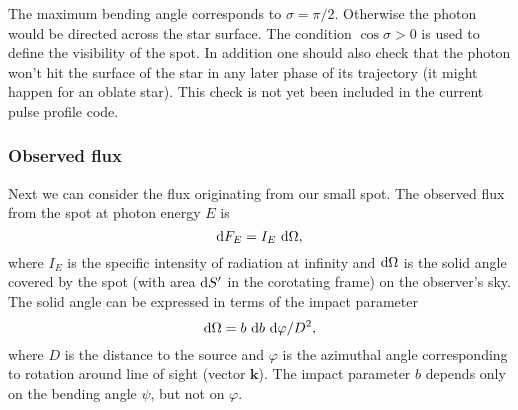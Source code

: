 \documentclass{wihuri}
\def\be{\begin{equation}}
\def\ee{\end{equation}}
\def\d{{\rm d}}
\def\Dop{\delta}
\def\ene{E}%
\newcommand{\bmath}[1]{\boldsymbol{#1}}
\begin{document}
The maximum bending angle corresponds to $\sigma=\pi/2$. Otherwise the photon would be directed across the star surface. 
The condition $\cos \sigma>0$ is used to define the visibility of the spot. In addition one should also check that the photon won't hit the surface of the star in any later phase of its trajectory (it might happen for an oblate star). This check is not yet been included in the current pulse profile code.


\subsubsection{Observed flux}

Next we can consider the flux originating from our small spot. The observed flux from the spot at photon energy $E$ is
\be
\label{eq:dF_E2}
  \d F_{\ene}=I_{\ene}\ \d\Omega,
\ee
where $I_{\ene}$ is the specific intensity of radiation at infinity and $\d\Omega$ is
the solid angle covered by the spot (with area $\d S'$ in the corotating frame) on the observer's sky.
The solid angle can be expressed in terms of the impact parameter \cite{pechenick}
\be
\d\Omega=b\ \d b\ \d\varphi/D^2,
\ee
where $D$ is the distance to the source and $\varphi$ is the azimuthal
angle corresponding to rotation around line of sight (vector $\bmath{k}$).
The impact parameter $b$ depends only on the bending angle $\psi$, but not on $\varphi$.

\end{document}
